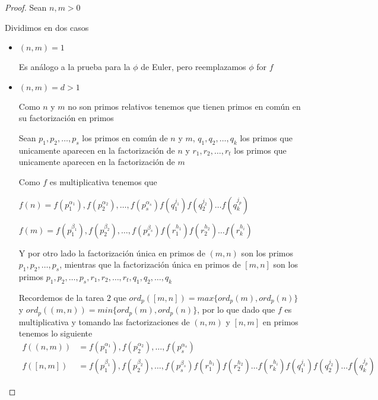 \documentclass[12pt]{article}
\begin{document}
\begin{enumerate}
            \begin{proof}
            
            Sean $n,m > 0$
            
            Dividimos en dos casos
            
            \begin{itemize}
                \item $(n,m) = 1$ 
                
                Es análogo a la prueba para la $\phi$ de Euler, pero reemplazamos $\phi$ for $f$
                
                
                \item $(n,m) = d > 1$
                
                Como $n$ y $m$ no son primos relativos tenemos que tienen primos en común en su factorización en primos
                
                Sean $p_1, p_2, \dots, p_s$ los primos en común de $n$ y $m$, $q_1,q_2, \dots , q_k$ los primos que unicamente aparecen en la factorización de 
                $n$ y $r_1,r_2, \dots , r_t$ los primos que unicamente aparecen en la factorización de $m$
                
                Como $f$ es multiplicativa tenemos que 
                
                $f(n) = f(p_1^{\alpha_1}), f(p_2^{\alpha_2}), \dots, f(p_s^{\alpha_s}) f(q_1^{j_1}) f(q_2^{j_2}) \dots f(q_k^{j_p})$
                
                $f(m) = f(p_1^{\beta_1}), f(p_2^{\beta_2}), \dots, f(p_s^{\beta_s}) f(r_1^{h_1}) f(r_2^{h_2}) \dots f(r_k^{h_i})$
                
                Y por otro lado la factorización única en primos de $(m,n)$ son los primos $p_1, p_2, \dots, p_s$, mientras que la factorización única
                en primos de $[m,n]$ son los primos $p_1, p_2, \dots, p_s, r_1,r_2, \dots , r_t, q_1,q_2, \dots , q_k$ 
                
                Recordemos de la tarea $2$ que $ord_p([m,n]) = max\{ord_p(m),ord_p(n)\}$ y  $ord_p((m,n)) = min\{ord_p(m),ord_p(n)\}$, por lo que dado que
                $f$ es multiplicativa y tomando las factorizaciones de $(n,m)$ y $[n,m]$ en primos tenemos lo siguiente
                \begin{align*}
                    f((n,m)) &= f(p_1^{\alpha_1}), f(p_2^{\alpha_2}), \dots, f(p_s^{\alpha_s}) \\
                    f([n,m]) &= f(p_1^{\beta_1}), f(p_2^{\beta_2}), \dots, f(p_s^{\beta_s}) f(r_1^{h_1}) f(r_2^{h_2}) \dots f(r_k^{h_i}) f(q_1^{j_1}) f(q_2^{j_2}) \dots f(q_k^{j_p})
                \end{align*}
                

\end{itemize}
\end{proof}
\end{enumerate}
\end{document}
